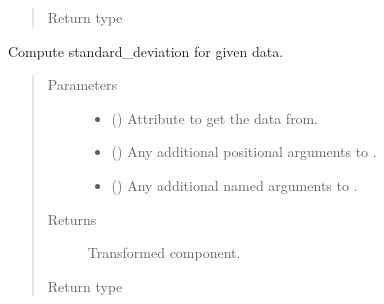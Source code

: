 \documentclass[letterpaper,10pt,english]{sphinxmanual}
\begin{document}
\begin{fulllineitems}
\begin{fulllineitems}
\begin{quote}
\begin{description}
\item[{Return type}] \leavevmode
{\hyperref[\detokenize{api/base_classes:geology.src.base_spatial.SpatialComponent}]{}}

\end{description}\end{quote}

\end{fulllineitems}


\begin{fulllineitems}
\label{\detokenize{api/base_classes:geology.src.base_spatial.SpatialComponent.standard_deviation}}
Compute standard\_deviation for given data.
\begin{quote}\begin{description}
\item[{Parameters}] \leavevmode\begin{itemize}
\item {} 
 (\sphinxstyleliteralemphasis{\sphinxupquote{, }}) \textendash{} Attribute to get the data from.

\item {} 
 () \textendash{} Any additional positional arguments to .

\item {} 
 () \textendash{} Any additional named arguments to .

\end{itemize}

\item[{Returns}] \leavevmode
{} \textendash{} Transformed component.

\item[{Return type}] \leavevmode
{\hyperref[\detokenize{api/base_classes:geology.src.base_spatial.SpatialComponent}]{}}


\end{description}
\end{quote}
\end{fulllineitems}
\end{fulllineitems}
\end{document}
